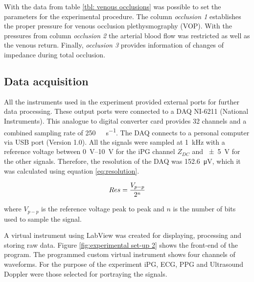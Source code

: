 With the data from table \ref{tbl: venous occlusions} was possible to set the parameters for the experimental procedure. The column \textit{occlusion 1} establishes the proper pressure for venous occlusion plethysmography (VOP). With the pressures from column \textit{occlusion 2} the arterial blood flow was restricted as well as the venous return. Finally, \textit{occlusion 3} provides information of changes of impedance during total occlusion.

\subsection{Data acquisition}
\label{section procedure 1.4}

All the instruments used in the experiment provided external ports for further data processing. These output ports were connected to a DAQ NI-6211 (National Instruments). This analogue to digital converter card provides 32 channels and a combined sampling rate of \SI{250}{\kilo\sample\per\second}. The DAQ connects to a personal computer via USB port (Version 1.0). All the signals were sampled at \SI{1}{\kilo\hertz} with a reference voltage between \SIrange{0}{10}{\volt} for the iPG channel $Z_{DC}$ and \SI{\pm 5}{\volt} for the other signals. Therefore, the resolution of the DAQ was \SI{152.6}{\micro\volt}, which it was calculated using equation \ref{eq:resolution}. 

\begin{align}
	\label{eq:resolution}
	Res =\frac{V_{p-p}}{2^{n}}		\tagaddtext{[\si{\volt}]}
\end{align}

where $V_{p-p}$ is the reference voltage peak to peak and $n$ is the number of bits used to sample the signal. 

A virtual instrument using LabView \cite{LabView:2016} was created for displaying, processing and storing raw data. Figure \ref{fig:experimental set-up 2} shows the front-end of the program. The programmed custom virtual instrument shows four channels of waveforms. For the purpose of the experiment iPG, ECG, PPG and Ultrasound Doppler were those selected for portraying the signals.

